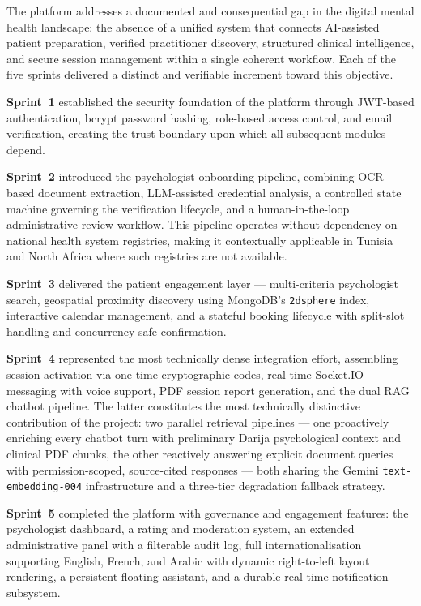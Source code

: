 \documentclass[a4paper,12pt]{report}
\begin{document}
The platform addresses a documented and consequential gap in the digital
mental health landscape: the absence of a unified system that connects
AI-assisted patient preparation, verified practitioner discovery, structured
clinical intelligence, and secure session management within a single coherent
workflow. Each of the five sprints delivered a distinct and verifiable
increment toward this objective.

\textbf{Sprint~1} established the security foundation of the platform through
JWT-based authentication, bcrypt password hashing, role-based access control,
and email verification, creating the trust boundary upon which all subsequent
modules depend.

\textbf{Sprint~2} introduced the psychologist onboarding pipeline,
combining OCR-based document extraction, LLM-assisted credential analysis,
a controlled state machine governing the verification lifecycle, and a
human-in-the-loop administrative review workflow. This pipeline operates
without dependency on national health system registries, making it
contextually applicable in Tunisia and North Africa where such registries
are not available.

\textbf{Sprint~3} delivered the patient engagement layer — multi-criteria
psychologist search, geospatial proximity discovery using MongoDB's
\texttt{2dsphere} index, interactive calendar management, and a stateful
booking lifecycle with split-slot handling and concurrency-safe confirmation.

\textbf{Sprint~4} represented the most technically dense integration effort,
assembling session activation via one-time cryptographic codes, real-time
Socket.IO messaging with voice support, PDF session report generation,
and the dual RAG chatbot pipeline. The latter constitutes the most
technically distinctive contribution of the project: two parallel retrieval
pipelines — one proactively enriching every chatbot turn with
preliminary Darija psychological context and clinical PDF chunks, the
other reactively answering explicit document queries with permission-scoped,
source-cited responses — both sharing the Gemini \texttt{text-embedding-004}
infrastructure and a three-tier degradation fallback strategy.

\textbf{Sprint~5} completed the platform with governance and engagement
features: the psychologist dashboard, a rating and moderation system,
an extended administrative panel with a filterable audit log, full
internationalisation supporting English, French, and Arabic with dynamic
right-to-left layout rendering, a persistent floating assistant, and a
durable real-time notification subsystem.
\end{document}
